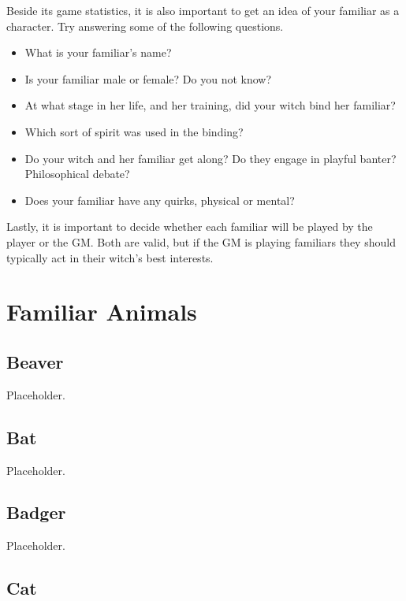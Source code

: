 
Beside its game statistics, it is also important to get an idea of your familiar as a character.
Try answering some of the following questions.

\begin{itemize}
	\item What is your familiar's name?
	\item Is your familiar male or female?
		Do you not know?
	\item At what stage in her life, and her training, did your witch bind her familiar?
	\item Which sort of spirit was used in the binding? %
	\item Do your witch and her familiar get along?
		Do they engage in playful banter?
		Philosophical debate?
	\item Does your familiar have any quirks, physical or mental?
\end{itemize}

Lastly, it is important to decide whether each familiar will be played by the player or the GM.
Both are valid, but if the GM is playing familiars they should typically act in their witch's best interests.

\section{Familiar Animals}

\subsection{Beaver}

Placeholder.

\subsection{Bat}

Placeholder.

\subsection{Badger}

Placeholder.

\subsection{Cat}

